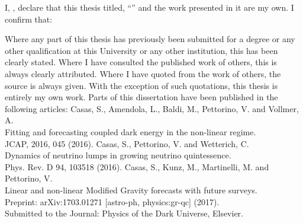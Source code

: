 \documentclass[
11pt, %
german, english,%
singlespacing, %
headsepline, %
]{MastersDoctoralThesis} %
\begin{document}


%
%
%


\begin{declaration}
	\addchaptertocentry{\authorshipname}
	\label{declaration-author}
	\noindent I, \authorname, declare that this thesis titled, \enquote{\ttitle} and the work presented in it are my own. I confirm that:
	
	\begin{outline} 
		\1 Where any part of this thesis has previously been submitted for a degree or any other qualification at this University or any other institution, this has been clearly stated.
		\1 Where I have consulted the published work of others, this is always clearly attributed.
		\1 Where I have quoted from the work of others, the source is always given. 
		With the exception of such quotations, this thesis is entirely my own work. 
		\1 Parts of this dissertation have been published in the following articles:
		\2 Casas, S., Amendola, L., Baldi, M., Pettorino, V. and Vollmer, A. \\
		Fitting and forecasting coupled dark energy in the non-linear regime. \\
		JCAP, 2016, 045 (2016).
		\2 Casas, S., Pettorino, V. and Wetterich, C. \\ 
		Dynamics of neutrino lumps in growing neutrino quintessence. \\
		Phys. Rev. D 94, 103518 (2016).
		\2 Casas, S., Kunz, M., Martinelli, M. and Pettorino, V. \\ 
		Linear and non-linear Modified Gravity forecasts with future surveys. \\ Preprint: arXiv:1703.01271 [astro-ph, physics:gr-qc] (2017). \\
		Submitted to the Journal: Physics of the Dark Universe, Elsevier.
	\end{outline}
	\vspace{1cm}
%	
\end{declaration}
\end{document}
